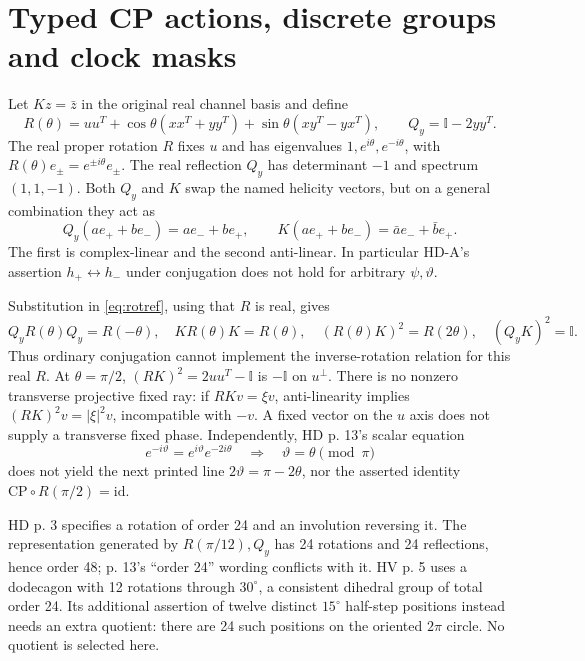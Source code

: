 \documentclass[11pt,a4paper]{article}
\numberwithin{equation}{section}
\newcommand{\I}{\mathbb I}\newcommand{\Argz}{\operatorname{Arg}_0}
\begin{document}
\section{Typed CP actions, discrete groups and clock masks}\label{sec:cp}
Let $Kz=\bar z$ in the original real channel basis and define
\begin{equation}\label{eq:rotref}
 R(\theta)=uu^T+\cos\theta(xx^T+yy^T)+\sin\theta(xy^T-yx^T),\qquad Q_y=\I-2yy^T.
\end{equation}
The real proper rotation $R$ fixes $u$ and has eigenvalues $1,e^{i\theta},e^{-i\theta}$, with $R(\theta)e_\pm=e^{\pm i\theta}e_\pm$. The real reflection $Q_y$ has determinant $-1$ and spectrum $(1,1,-1)$. Both $Q_y$ and $K$ swap the named helicity vectors, but on a general combination they act as
\begin{equation}
 Q_y(ae_++be_-)=ae_-+be_+,\qquad K(ae_++be_-)=\bar a e_-+\bar b e_+.
\end{equation}
The first is complex-linear and the second anti-linear. In particular HD-A's assertion $h_+\leftrightarrow h_-$ under conjugation does not hold for arbitrary $\psi,\vartheta$.

Substitution in \eqref{eq:rotref}, using that $R$ is real, gives
\begin{equation}\label{eq:cprelations}
 Q_yR(\theta)Q_y=R(-\theta),\quad KR(\theta)K=R(\theta),\quad
 (R(\theta)K)^2=R(2\theta),\quad(Q_yK)^2=\I.
\end{equation}
Thus ordinary conjugation cannot implement the inverse-rotation relation for this real $R$. At $\theta=\pi/2$, $(RK)^2=2uu^T-\I$ is $-\I$ on $u^\perp$. There is no nonzero transverse projective fixed ray: if $RKv=\xi v$, anti-linearity implies $(RK)^2v=|\xi|^2v$, incompatible with $-v$. A fixed vector on the $u$ axis does not supply a transverse fixed phase. Independently, HD p. 13's scalar equation
\begin{equation}
 e^{-i\vartheta}=e^{i\vartheta}e^{-2i\theta}
 \quad\Longrightarrow\quad \vartheta=\theta\pmod\pi
\end{equation}
does not yield the next printed line $2\vartheta=\pi-2\theta$, nor the asserted identity $\mathrm{CP}\circ R(\pi/2)=\mathrm{id}$.

HD p. 3 specifies a rotation of order 24 and an involution reversing it. The representation generated by $R(\pi/12),Q_y$ has 24 rotations and 24 reflections, hence order 48; p. 13's ``order 24'' wording conflicts with it. HV p. 5 uses a dodecagon with 12 rotations through $30^\circ$, a consistent dihedral group of total order 24. Its additional assertion of twelve distinct $15^\circ$ half-step positions instead needs an extra quotient: there are 24 such positions on the oriented $2\pi$ circle. No quotient is selected here.
\end{document}
